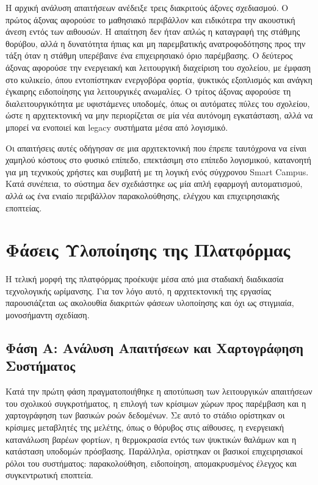 Η αρχική ανάλυση απαιτήσεων ανέδειξε τρεις διακριτούς άξονες σχεδιασμού. Ο πρώτος άξονας αφορούσε το μαθησιακό περιβάλλον και ειδικότερα την ακουστική άνεση εντός των αιθουσών. Η απαίτηση δεν ήταν απλώς η καταγραφή της στάθμης θορύβου, αλλά η δυνατότητα ήπιας και μη παρεμβατικής ανατροφοδότησης προς την τάξη όταν η στάθμη υπερέβαινε ένα επιχειρησιακό όριο παρέμβασης. Ο δεύτερος άξονας αφορούσε την ενεργειακή και λειτουργική διαχείριση του σχολείου, με έμφαση στο κυλικείο, όπου εντοπίστηκαν ενεργοβόρα φορτία, ψυκτικός εξοπλισμός και ανάγκη έγκαιρης ειδοποίησης για λειτουργικές ανωμαλίες. Ο τρίτος άξονας αφορούσε τη διαλειτουργικότητα με υφιστάμενες υποδομές, όπως οι αυτόματες πύλες του σχολείου, ώστε η αρχιτεκτονική να μην περιορίζεται σε μία νέα αυτόνομη εγκατάσταση, αλλά να μπορεί να ενοποιεί και \textlatin{legacy} συστήματα μέσα από λογισμικό.

Οι απαιτήσεις αυτές οδήγησαν σε μια αρχιτεκτονική που έπρεπε ταυτόχρονα να είναι χαμηλού κόστους στο φυσικό επίπεδο, επεκτάσιμη στο επίπεδο λογισμικού, κατανοητή για μη τεχνικούς χρήστες και συμβατή με τη λογική ενός σύγχρονου \textlatin{Smart Campus}. Κατά συνέπεια, το σύστημα δεν σχεδιάστηκε ως μία απλή εφαρμογή αυτοματισμού, αλλά ως ένα ενιαίο περιβάλλον παρακολούθησης, ελέγχου και επιχειρησιακής εποπτείας.

\section{Φάσεις Υλοποίησης της Πλατφόρμας}
Η τελική μορφή της πλατφόρμας προέκυψε μέσα από μια σταδιακή διαδικασία τεχνολογικής ωρίμανσης. Για τον λόγο αυτό, η αρχιτεκτονική της εργασίας παρουσιάζεται ως ακολουθία διακριτών φάσεων υλοποίησης και όχι ως στιγμιαία, μονοσήμαντη σχεδίαση.

\subsection{Φάση Α: Ανάλυση Απαιτήσεων και Χαρτογράφηση Συστήματος}
Κατά την πρώτη φάση πραγματοποιήθηκε η αποτύπωση των λειτουργικών απαιτήσεων του σχολικού συγκροτήματος, η επιλογή των κρίσιμων χώρων προς παρέμβαση και η χαρτογράφηση των βασικών ροών δεδομένων. Σε αυτό το στάδιο ορίστηκαν οι κρίσιμες μεταβλητές της μελέτης, όπως ο θόρυβος στις αίθουσες, η ενεργειακή κατανάλωση βαρέων φορτίων, η θερμοκρασία εντός των ψυκτικών θαλάμων και η κατάσταση υποδομών πρόσβασης. Παράλληλα, ορίστηκαν οι βασικοί επιχειρησιακοί ρόλοι του συστήματος: παρακολούθηση, ειδοποίηση, απομακρυσμένος έλεγχος και συγκεντρωτική εποπτεία.

